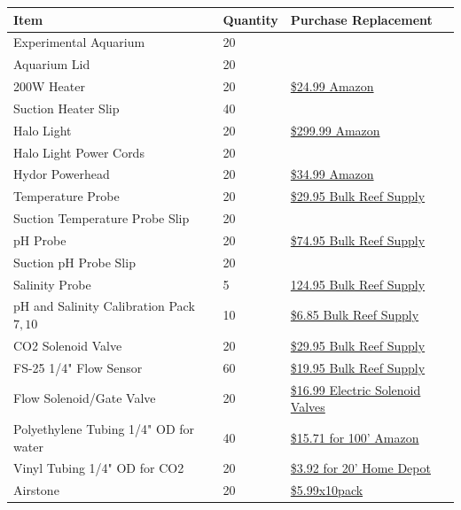 \documentclass[]{book}
\begin{document}
\begin{longtable}[]{@{}lll@{}}
\toprule
Item & Quantity & Purchase Replacement\tabularnewline
\midrule
\endhead
Experimental Aquarium & 20 &\tabularnewline
Aquarium Lid & 20 &\tabularnewline
200W Heater & 20 &
\href{https://www.amazon.com/Hydor-Submersible-Glass-Aquarium-Heater/dp/B00061UQ7K}{\$24.99
Amazon}\tabularnewline
Suction Heater Slip & 40 &\tabularnewline
Halo Light & 20 &
\href{https://www.amazon.com/Aquatic-Life-Halo-Basic-Fixture/dp/B00T6FGDJW}{\$299.99
Amazon}\tabularnewline
Halo Light Power Cords & 20 &\tabularnewline
Hydor Powerhead & 20 &
\href{https://www.amazon.com/Hydor-Koralia-Nano-Aquarium-Circulation/dp/B0036S70ZG/ref=sr_1_2?keywords=hydor+powerhead\&qid=1572981966\&s=pet-supplies\&sr=1-2}{\$34.99
Amazon}\tabularnewline
Temperature Probe & 20 &
\href{https://www.bulkreefsupply.com/temperature-probe-neptune-systems.html}{\$29.95
Bulk Reef Supply}\tabularnewline
Suction Temperature Probe Slip & 20 &\tabularnewline
pH Probe & 20 &
\href{https://www.bulkreefsupply.com/lab-grade-double-junction-ph-probe-neptune-systems.html}{\$74.95
Bulk Reef Supply}\tabularnewline
Suction pH Probe Slip & 20 &\tabularnewline
Salinity Probe & 5 &
\href{https://www.bulkreefsupply.com/neptune-systems-lab-grade-conductivity-probe.html}{124.95
Bulk Reef Supply}\tabularnewline
pH and Salinity Calibration Pack \(7,10\) & 10 &
\href{https://www.bulkreefsupply.com/probe-calibration-kit-ph-7-0-ph-10-0-salinity-53000us-neptune-systems.html}{\$6.85
Bulk Reef Supply}\tabularnewline
CO2 Solenoid Valve & 20 &
\href{https://www.bulkreefsupply.com/sv-1-solenoid-valve-neptune-systems.html}{\$29.95
Bulk Reef Supply}\tabularnewline
FS-25 1/4" Flow Sensor & 60 &
\href{https://www.bulkreefsupply.com/1-4-flow-sensor-fs25-neptune-systems.html}{\$19.95
Bulk Reef Supply}\tabularnewline
Flow Solenoid/Gate Valve & 20 &
\href{https://www.electricsolenoidvalves.com/1-4-120v-ac-electric-plastic-solenoid-valve/}{\$16.99
Electric Solenoid Valves}\tabularnewline
Polyethylene Tubing 1/4" OD for water & 40 &
\href{https://www.amazon.com/Dixon-0817-Polyethylene-DI087002-Natural/dp/B00LT0T3MG/ref=sr_1_4?crid=ETZJL4UXADQY\&dchild=1\&keywords=polyethylene+tubing+1\%2F4+od\&qid=1590806141\&sprefix=polyethylene+tubing\%2Caps\%2C211\&sr=8-4\#feature-bullets-btf}{\$15.71
for 100' Amazon}\tabularnewline
Vinyl Tubing 1/4" OD for CO2 & 20 &
\href{https://www.homedepot.com/p/Everbilt-1-4-in-O-D-x-1-6-in-I-D-x-20-ft-Clear-PVC-Vinyl-Tubing-701968/207144351}{\$3.92
for 20' Home Depot}\tabularnewline
Airstone & 20 &
\href{https://www.amazon.com/Pawfly-Cylinder-Diffuser-Airstones-Hydroponics/dp/B075QCWGZQ/ref=sr_1_5?crid=3EXLLKKDA2NYZ\&keywords=airstones+for+aquariums\&qid=1572983301\&sprefix=airstone\%2Caps\%2C197\&sr=8-5}{\$5.99x10pack
}
\end{longtable}
\end{document}
